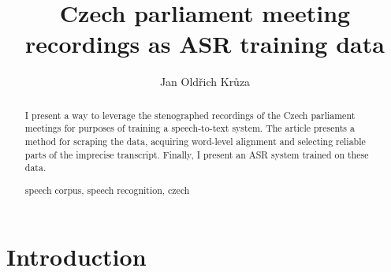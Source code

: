 \documentclass[runningheads,a4paper]{llncs}
\newcommand{\keywords}[1]{\par\addvspace\baselineskip
\noindent\keywordname\enspace\ignorespaces#1}
\begin{document}
\mainmatter  %

\title{Czech parliament meeting recordings as ASR training data}


%
%
\author{Jan Oldřich Krůza}
%


%
%

\maketitle


\begin{abstract}
I present a way to leverage the stenographed recordings of the Czech parliament
meetings for purposes of training a speech-to-text system. The article presents
a method for scraping the data, acquiring word-level alignment and selecting
reliable parts of the imprecise transcript. Finally, I present an ASR system
trained on these data.
\keywords{speech corpus, speech recognition, czech}
\end{abstract}


\section{Introduction}
\end{document}
